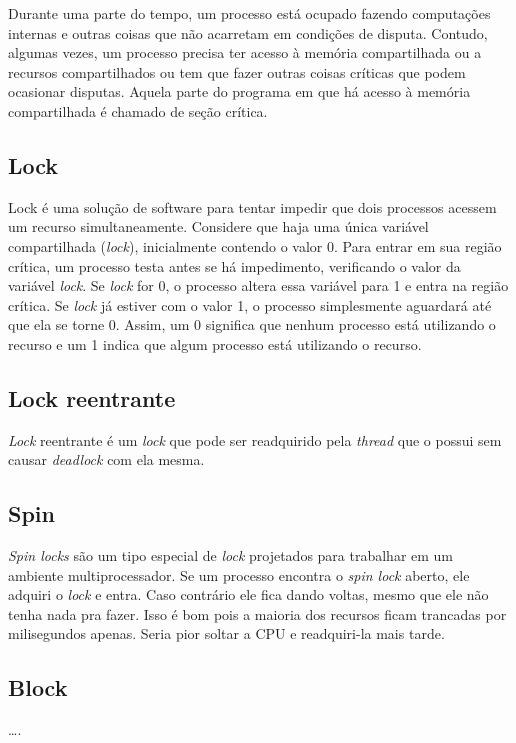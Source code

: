 Durante uma parte do tempo, um processo está ocupado fazendo computações internas e outras coisas que não acarretam
em condições de disputa. Contudo, algumas vezes, um processo precisa ter acesso à memória compartilhada ou a recursos compartilhados ou tem que fazer outras coisas críticas que podem ocasionar disputas. Aquela parte do programa
em que há acesso à memória compartilhada é chamado de seção crítica.


\subsection{Lock}

Lock é uma solução de software para tentar impedir que dois processos acessem um recurso 
simultaneamente. Considere que haja uma única variável compartilhada (\textit{lock}), inicialmente 
contendo o valor 0. Para entrar em sua região crítica, um processo testa antes se há 
impedimento, verificando o valor da variável \textit{lock}. Se \textit{lock} for 0, o processo altera essa 
variável para 1 e entra na região crítica. Se \textit{lock} já estiver com o valor 1, o processo 
simplesmente aguardará até que ela se torne 0. Assim, um 0 significa que nenhum processo 
está utilizando o recurso e um 1 indica que algum processo está utilizando o recurso. 


\subsection{Lock reentrante}

\textit{Lock} reentrante é um \textit{lock} que pode ser readquirido pela \textit{thread} que o possui sem causar \textit{deadlock} com ela mesma.

\subsection{Spin}

\textit{Spin locks} são um tipo especial de \textit{lock} projetados para trabalhar em um ambiente 
multiprocessador. Se um processo encontra o \textit{spin lock} aberto, ele adquiri o \textit{lock} e entra. 
Caso contrário ele fica dando voltas, mesmo que ele não tenha nada pra fazer. Isso é bom 
pois a maioria dos recursos ficam trancadas por milisegundos apenas. Seria pior soltar a 
CPU e readquiri-la mais tarde.

\subsection{Block}
….



